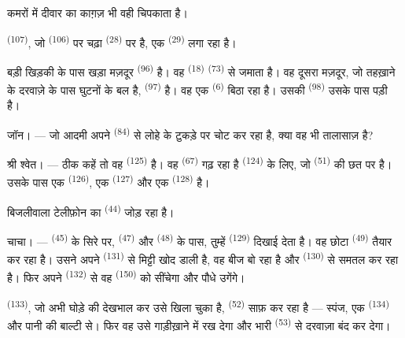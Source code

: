 कमरों में दीवार का काग़ज़ भी वही चिपकाता है।

 \textsuperscript{(107)}, जो 
\textsuperscript{(106)} पर चढ़ा  \textsuperscript{(28)} पर
है, एक  \textsuperscript{(29)} लगा रहा है।

बड़ी खिड़की के पास खड़ा मज़दूर  \textsuperscript{(96)} है। वह
 \textsuperscript{(18)}  \textsuperscript{(73)} से
जमाता है। वह दूसरा मज़दूर, जो तहख़ाने के दरवाज़े के पास घुटनों के बल है,
 \textsuperscript{(97)} है। वह एक 
\textsuperscript{(6)} बिठा रहा है। उसकी  \textsuperscript{(98)} उसके
पास पड़ी है।

\textsc{जॉन}। --- जो आदमी अपने  \textsuperscript{(84)} से लोहे के
टुकड़े पर चोट कर रहा है, क्या वह भी तालासाज़ है?

\textsc{श्री श्वेत}। --- ठीक कहें तो वह  \textsuperscript{(125)} है।
वह  \textsuperscript{(67)} गढ़ रहा है
 \textsuperscript{(124)} के लिए, जो 
\textsuperscript{(51)} की छत पर है। उसके पास एक  \textsuperscript{(126)}, एक 
\textsuperscript{(127)} और एक  \textsuperscript{(128)} है।

बिजलीवाला टेलीफ़ोन का  \textsuperscript{(44)} जोड़ रहा है।

\VUsaut{3.0mm}

\textsc{चाचा}। ---  \textsuperscript{(45)} के सिरे पर,
 \textsuperscript{(47)} और 
\textsuperscript{(48)} के पास, तुम्हें  \textsuperscript{(129)} दिखाई
देता है। वह छोटा  \textsuperscript{(49)} तैयार कर रहा है। उसने
अपने  \textsuperscript{(131)} से मिट्टी खोद डाली है, वह बीज बो रहा
है और  \textsuperscript{(130)} से समतल कर रहा है। फिर अपने
 \textsuperscript{(132)} से वह 
\textsuperscript{(150)} को सींचेगा और पौधे उगेंगे।

 \textsuperscript{(133)}, जो अभी घोड़े की देखभाल कर उसे खिला चुका
है,  \textsuperscript{(52)} साफ़ कर रहा है — स्पंज, एक
 \textsuperscript{(134)} और पानी की बाल्टी से। फिर वह उसे गाड़ीख़ाने में
रख देगा और भारी  \textsuperscript{(53)} से दरवाज़ा बंद कर देगा।

